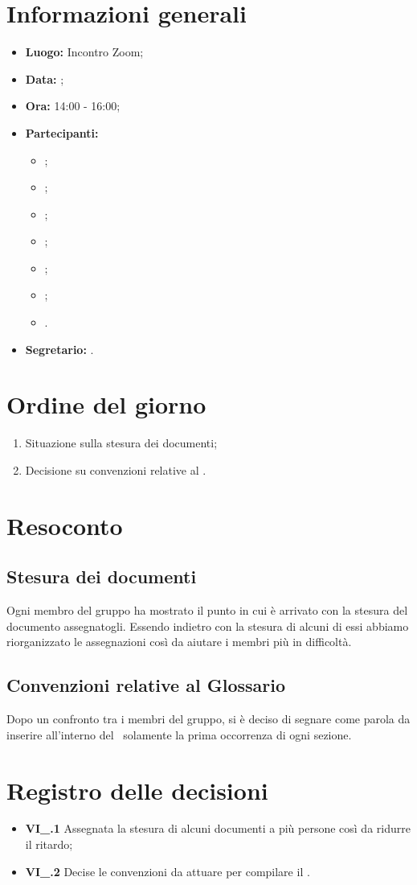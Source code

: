 \section{Informazioni generali}
\begin{itemize}
\item \textbf{Luogo:} Incontro Zoom;
\item \textbf{Data:} \Data;
\item \textbf{Ora:} 14:00 - 16:00;
\item \textbf{Partecipanti:}
	\begin{itemize}
		\item \BL{}; 
		\item \FF{};
		\item \MM{}; 
		\item \PC{};
		\item \TG{};
		\item \TL{};
		\item \VD{}.
	\end{itemize} 
\item \textbf{Segretario:} \PC{}.
\end{itemize}

\section{Ordine del giorno}
\begin{enumerate}
 \item Situazione sulla stesura dei documenti;
 \item Decisione su convenzioni relative al \Glossario.
\end{enumerate}

\section{Resoconto}
\subsection{Stesura dei documenti}
Ogni membro del gruppo ha mostrato il punto in cui è arrivato con la stesura del documento assegnatogli. Essendo indietro con la stesura di alcuni di essi abbiamo riorganizzato le assegnazioni così da aiutare i membri più in difficoltà.
\subsection{Convenzioni relative al Glossario}
Dopo un confronto tra i membri del gruppo, si è deciso di segnare come parola da inserire all'interno del \Glossario\ solamente la prima occorrenza di ogni sezione.

\section{Registro delle decisioni}
\begin{itemize}
  \item \textbf{VI\_\Data.1} Assegnata la stesura di alcuni documenti a più persone così da ridurre il ritardo;
  \item \textbf{VI\_\Data.2} Decise le convenzioni da attuare per compilare il \Glossario.
\end{itemize}